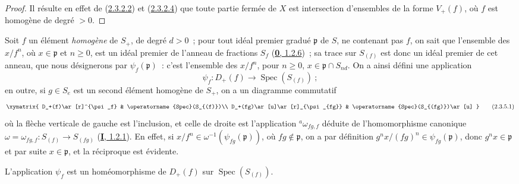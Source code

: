 \begin{proof}
Il résulte en effet de (\hyperref[II.2.3.2.2-fr]{2.3.2.2}) et
(\hyperref[II.2.3.2.4-fr]{2.3.2.4}) que toute partie fermée de $X$ est
intersection d'ensembles de la forme $V_+(f)$, où $f$ est homogène de degré
$>0$.
\end{proof}

\begin{env}[2.3.5]
\label{II.2.3.5-fr}
Soit $f$ un élément \emph{homogène} de $S_+$, de degré $d>0$~; pour tout
idéal premier gradué $\mathfrak{p}$ de $S$, ne contenant pas $f$, on sait
que l'ensemble des $x/f^n$, où $x\in\mathfrak{p}$ et $n\geq 0$, est un
idéal premier de l'anneau de fractions $S_f$
(\hyperref[0.1.2.6-fr]{\textbf{0}, 1.2.6})~; sa trace sur $S_{(f)}$ est donc un idéal
premier de cet anneau, que nous désignerons par
$\psi_f(\mathfrak{p})$~: c'est l'ensemble des $x/f^n$, pour $n\geq 0$,
$x\in\mathfrak{p}\cap S_{nd}$. On a ainsi défini une application
\[
  \psi_f:D_+(f)\longrightarrow\operatorname{Spec}(S_{(f)})~;
\]
en outre, si $g\in S_e$ est un second élément homogène de $S_+$, on a un
diagramme commutatif
\[
  \label{II.2.3.5.1-fr}
  \xymatrix{
    D_+(f)\ar[r]^{\psi_f}
    & \operatorname{Spec}(S_{(f)})\\
    D_+(fg)\ar[u]\ar[r]_{\psi_{fg}}
    & \operatorname{Spec}(S_{(fg)})\ar[u]
  }
  \tag{2.3.5.1}
\]
où la flèche verticale de gauche est l'inclusion, et celle de droite est
l'application ${}^a\omega_{fg,f}$ déduite de l'homomorphisme canonique
$\omega=\omega_{fg,f}:S_{(f)}\to S_{(fg)}$
(\hyperref[I.1.2.1-fr]{\textbf{I}, 1.2.1}). En effet, si
$x/f^n\in\omega^{-1}(\psi_{fg}(\mathfrak{p}))$, où
$fg\notin\mathfrak{p}$, on a par définition
$g^n x/(fg)^n\in\psi_{fg}(\mathfrak{p})$, donc
$g^n x\in\mathfrak{p}$ et par suite $x\in\mathfrak{p}$, et la réciproque
est évidente.
\end{env}

\begin{proposition}[2.3.6]
\label{II.2.3.6-fr}
L'application $\psi_f$ est un homéomorphisme de $D_+(f)$ sur
$\operatorname{Spec}(S_{(f)})$.
\end{proposition}

